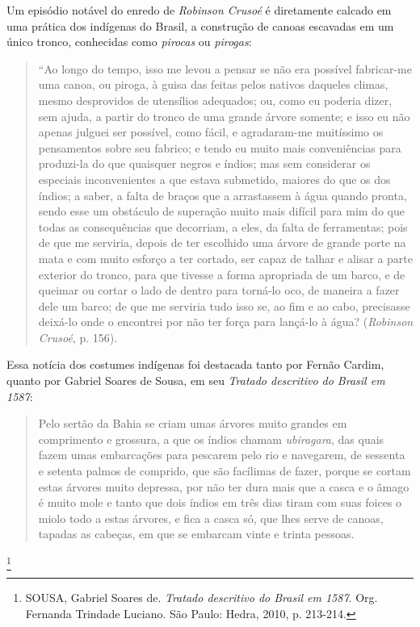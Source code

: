 \documentclass[12pt]{extarticle}
\begin{document}
Um episódio notável do enredo de \emph{Robinson Crusoé} é diretamente
calcado em uma prática dos indígenas do Brasil, a construção de canoas
escavadas em um único tronco, conhecidas como \emph{pirocas} ou
\emph{pirogas}:

\begin{quote}
``Ao longo do tempo, isso me levou a pensar se não era possível
fabricar-me uma canoa, ou piroga, à guisa das feitas pelos nativos
daqueles climas, mesmo desprovidos de utensílios adequados; ou, como eu
poderia dizer, sem ajuda, a partir do tronco de uma grande árvore
somente; e isso eu não apenas julguei ser possível, como fácil, e
agradaram-me muitíssimo os pensamentos sobre seu fabrico; e tendo eu
muito mais conveniências para produzi-la do que quaisquer negros e
índios; mas sem considerar os especiais inconvenientes a que estava
submetido, maiores do que os dos índios; a saber, a falta de braços que
a arrastassem à água quando pronta, sendo esse um obstáculo de superação
muito mais difícil para mim do que todas as consequências que decorriam,
a eles, da falta de ferramentas; pois de que me serviria, depois de ter
escolhido uma árvore de grande porte na mata e com muito esforço a ter
cortado, ser capaz de talhar e alisar a parte exterior do tronco, para
que tivesse a forma apropriada de um barco, e de queimar ou cortar o
lado de dentro para torná-lo oco, de maneira a fazer dele um barco; de
que me serviria tudo isso se, ao fim e ao cabo, precisasse deixá-lo onde
o encontrei por não ter força para lançá-lo à água? (\emph{Robinson
Crusoé}, p. 156).
\end{quote}


Essa notícia dos costumes indígenas foi destacada tanto por Fernão
Cardim, quanto por Gabriel Soares de Sousa, em seu \emph{Tratado
descritivo do Brasil em 1587}:

\begin{quote}
Pelo sertão da Bahia se criam umas árvores muito grandes em comprimento
e grossura, a que os índios chamam \emph{ubiragara}, das quais fazem umas
embarcações para pescarem pelo rio e navegarem, de sessenta e setenta
palmos de comprido, que são facílimas de fazer, porque se cortam estas
árvores muito depressa, por não ter dura mais que a casca e o âmago é
muito mole e tanto que dois índios em três dias tiram com suas foices o
miolo todo a estas árvores, e fica a casca só, que lhes serve de canoas,
tapadas as cabeças, em que se embarcam vinte e trinta
pessoas.\end{quote}\footnote{SOUSA, Gabriel Soares de. \emph{Tratado descritivo
  do Brasil em 1587}. Org. Fernanda Trindade Luciano. São Paulo: Hedra,
  2010, p. 213-214.}
\end{document}
